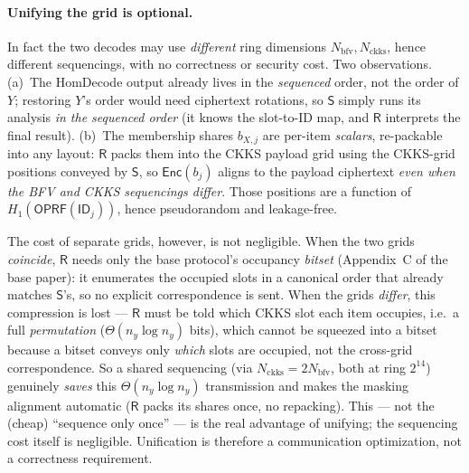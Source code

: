 \documentclass[11pt]{article}
\newcommand{\Rcv}{\mathsf{R}}
\newcommand{\Snd}{\mathsf{S}}
\newcommand{\Enc}{\mathsf{Enc}}
\newcommand{\OPRF}{\mathsf{OPRF}}
\theoremstyle{plain}
\theoremstyle{definition}
\begin{document}
\paragraph{Unifying the grid is optional.} In fact the two decodes may use \emph{different}
ring dimensions $N_{\mathrm{bfv}},N_{\mathrm{ckks}}$, hence different sequencings, with no
correctness or security cost. Two observations. (a)~The HomDecode output already lives in the
\emph{sequenced} order, not the order of $Y$; restoring $Y$'s order would need ciphertext
rotations, so $\Snd$ simply runs its analysis \emph{in the sequenced order} (it knows the
slot-to-ID map, and $\Rcv$ interprets the final result). (b)~The membership shares $b_{X,j}$
are per-item \emph{scalars}, re-packable into any layout: $\Rcv$ packs them into the CKKS
payload grid using the CKKS-grid positions conveyed by $\Snd$, so $\Enc(b_j)$ aligns to the
payload ciphertext \emph{even when the BFV and CKKS sequencings differ}. Those positions are a
function of $H_1(\OPRF(\mathsf{ID}_j))$, hence pseudorandom and leakage-free.

The cost of separate grids, however, is not negligible. When the two grids \emph{coincide},
$\Rcv$ needs only the base protocol's occupancy \emph{bitset} (Appendix~C of the base paper):
it enumerates the occupied slots in a canonical order that already matches $\Snd$'s, so no
explicit correspondence is sent. When the grids \emph{differ}, this compression is lost ---
$\Rcv$ must be told which CKKS slot each item occupies, i.e.\ a full \emph{permutation}
($\Theta(n_y\log n_y)$ bits), which cannot be squeezed into a bitset because a bitset conveys
only \emph{which} slots are occupied, not the cross-grid correspondence. So a shared sequencing
(via $N_{\mathrm{ckks}}=2N_{\mathrm{bfv}}$, both at ring $2^{14}$) genuinely \emph{saves} this
$\Theta(n_y\log n_y)$ transmission and makes the masking alignment automatic ($\Rcv$ packs its
shares once, no repacking). This --- not the (cheap) ``sequence only once'' --- is the real
advantage of unifying; the sequencing cost itself is negligible. Unification is therefore a
communication optimization, not a correctness requirement.
\end{document}
